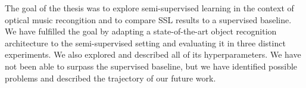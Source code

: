The goal of the thesis was to explore semi-supervised learning in the context of optical music recongition and to compare SSL results to a supervised baseline. We have fulfilled the goal by adapting a state-of-the-art object recognition architecture to the semi-supervised setting and evaluating it in three distinct experiments. We also explored and described all of its hyperparameters. We have not been able to surpass the supervised baseline, but we have identified possible problems and described the trajectory of our future work.
